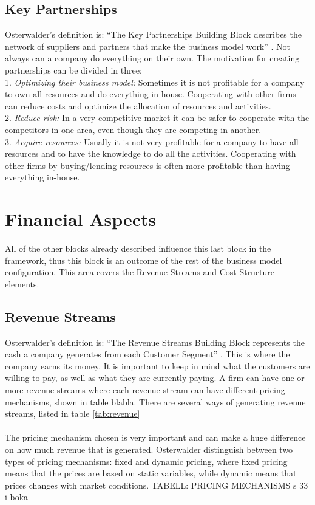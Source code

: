 \subsection{Key Partnerships}
Osterwalder’s definition is: “The Key Partnerships Building Block describes the network of suppliers and partners that make the business model work” \cite{osterwalder}. Not always can a company do everything on their own. The motivation for creating partnerships can be divided in three: 
\\
1. \emph{Optimizing their business model:} Sometimes it is not profitable for a company to own all resources and do everything in-house. Cooperating with other firms can reduce costs and optimize the allocation of resources and activities. 
\\
2. \emph{Reduce risk:} In a very competitive market it can be safer to cooperate with the competitors in one area, even though they are competing in another.
\\
3. \emph{Acquire resources:} Usually it is not very profitable for a company to have all resources and to have the knowledge to do all the activities. Cooperating with other firms by buying/lending resources is often more profitable than having everything in-house. \cite{osterwalder}

\section{Financial Aspects}
All of the other blocks already described influence this last block in the framework, thus this block is an outcome of the rest of the business model configuration. This area covers the Revenue Streams and Cost Structure elements. \cite{osterwalderthesis}

\subsection{Revenue Streams}
Osterwalder’s definition is: “The Revenue Streams Building Block represents the cash a company generates from each Customer Segment” \cite{osterwalder}. This is where the company earns its money. It is important to keep in mind what the customers are willing to pay, as well as what they are currently paying. A firm can have one or more revenue streams where each revenue stream can have different pricing mechanisms, shown in table blabla. There are several ways of generating revenue streams, listed in table \ref{tab:revenue}  \\ \\ 
The pricing mechanism chosen is very important and can make a huge difference on how much revenue that is generated. Osterwalder distinguish between two types of pricing mechanisms: fixed and dynamic pricing, where fixed pricing means that the prices are based on static variables, while dynamic means that prices changes with market conditions. \cite{osterwalder}
TABELL: PRICING MECHANISMS s 33 i boka

